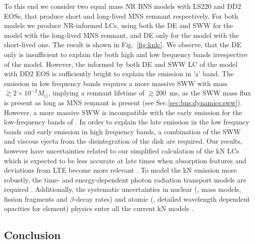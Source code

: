 To this end we consider two equal mass \ac{NR} \ac{BNS} models with LS220 and DD2 \acp{EOS}, that produce short and long-lived \ac{MNS} remnant respectively. 
For both models we produce \ac{NR}-informed \acp{LC}, using both the \ac{DE} and \ac{SWW} for the model with the long-lived \ac{MNS} remnant, and \ac{DE} only for the model with the short-lived one.
The result is shown in Fig.~\ref{fig:knlc}.
We observe, that the \ac{DE} only is insufficient to explain the \AT{} both high and low frequency bands irrespective of the model. However, the informed by both \ac{DE} and \ac{SWW} \ac{LC} of the model with DD2 \ac{EOS} is sufficiently bright to explain the emission in 'z' band. 
The emission in low frequency bands requires a more massive 
\ac{SWW} with mass ${\gtrsim} 2\times10^{-2}M_{\odot}$, implying a remnant lifetime of ${\gtrsim}200$~ms, as the \ac{SWW} mass flux is present as long 
as \ac{MNS} remnant is present (see Sec.\ref{sec:bns:dynamics:sww}).
However, a more massive \ac{SWW} is incompatible with
the early emission for the low-frequency bands of \AT{}.
In order to explain the late emission in the low frequncy bands and 
early emission in high frequency bands, a combination of the \ac{SWW} and 
viscous ejecta from the disintegration of the disk are required.
Our results, however have uncertainties related to our simplified calculation of
the \ac{kN} \acp{LC} which is expected to be less accurate at
late times when absorption features and deviations from \ac{LTE} become more relevant \citep[see \eg][]{Smartt:2017fuw}.
To model the \ac{kN} emission more robustly, the time- and energy-dependent 
photon radiation transport models are required 
\citep{Kasen:2017sxr,Tanaka:2017qxj,Miller:2019dpt,Bulla:2019muo}.
Additionally, the systematic uncertainties in
nuclear (\eg, mass models, fission fragments and $\beta$-decay
rates) and atomic (\eg, detailed wavelength dependent opacities for
\rproc{} element) physics enter all the current \ac{kN} models 
\citep{Eichler:2014kma,Rosswog:2016dhy,Gaigalas:2019ptx}.

\subsection{Conclusion}

